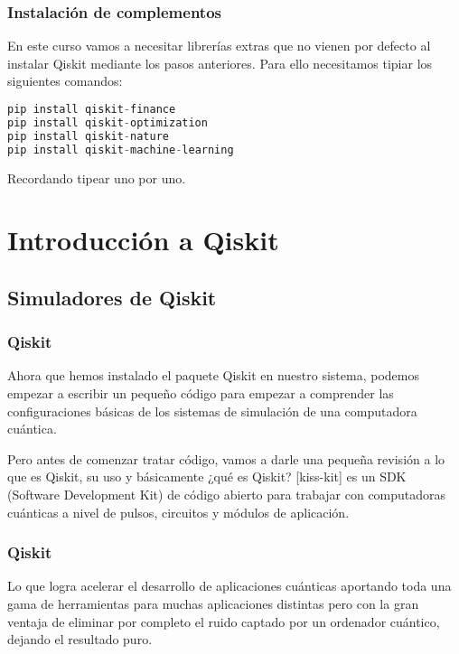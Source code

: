 \documentclass[spanish]{beamer}
\begin{document}
\begin{frame}[fragile]\frametitle{Instalación de complementos}
\justify\setlength{\parskip}{5mm}
En este curso vamos a necesitar librerías extras que no vienen por defecto al instalar Qiskit mediante los pasos anteriores. Para ello necesitamos tipiar los siguientes comandos:
\begin{lstlisting}[language=c++]
pip install qiskit-finance
pip install qiskit-optimization
pip install qiskit-nature
pip install qiskit-machine-learning\end{lstlisting}
Recordando tipear uno por uno.
\end{frame}
\section{Introducción a Qiskit}\subsection{Simuladores de Qiskit}
\justify\setlength{\parskip}{5mm}
\begin{frame}\frametitle{Qiskit} 

Ahora que hemos instalado el paquete Qiskit en nuestro sistema, podemos empezar a escribir un pequeño código para empezar a comprender las configuraciones básicas de los sistemas de simulación de una computadora cuántica.

Pero antes de comenzar tratar código, vamos a darle una pequeña revisión a lo que es Qiskit, su uso y básicamente ¿qué es Qiskit? [kiss-kit] es un SDK (Software Development Kit) de código abierto para trabajar con computadoras cuánticas a nivel de pulsos, circuitos y módulos de aplicación. 
\end{frame} 

\newpage\justify\setlength{\parskip}{5mm}
\begin{frame}\frametitle{Qiskit} 
Lo que logra acelerar el desarrollo de aplicaciones cuánticas aportando toda una gama de herramientas para muchas aplicaciones distintas pero con la gran ventaja de eliminar por completo el ruido captado por un ordenador cuántico, dejando el resultado puro.
\end{frame} 
\end{document}
